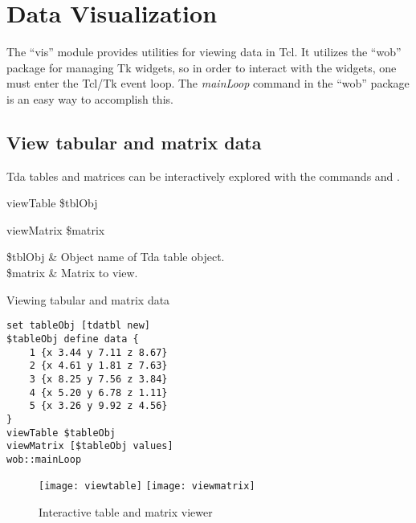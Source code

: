 \cleartooddpage[\thispagestyle{empty}]
\chapter{Data Visualization}\label{vis}
The ``vis'' module provides utilities for viewing data in Tcl. It utilizes the ``wob'' package for managing Tk widgets, so in order to interact with the widgets, one must enter the Tcl/Tk event loop. The \textit{mainLoop} command in the ``wob'' package is an easy way to accomplish this.

\clearpage
\section{View tabular and matrix data}
Tda tables and matrices can be interactively explored with the commands  and .

\begin{syntax}
viewTable \$tblObj
\end{syntax}
\begin{syntax}
viewMatrix \$matrix
\end{syntax}
\begin{args}
\$tblObj & Object name of Tda table object. \\
\$matrix  & Matrix to view. 
\end{args}
\begin{example}{Viewing tabular and matrix data}
\begin{lstlisting}
set tableObj [tdatbl new]
$tableObj define data {
    1 {x 3.44 y 7.11 z 8.67}
    2 {x 4.61 y 1.81 z 7.63}
    3 {x 8.25 y 7.56 z 3.84}
    4 {x 5.20 y 6.78 z 1.11}
    5 {x 3.26 y 9.92 z 4.56}
}
viewTable $tableObj
viewMatrix [$tableObj values]
wob::mainLoop
\end{lstlisting}
\end{example}
\begin{figure}[!htb]
\centering
\texttt{[image: viewtable]}
\texttt{[image: viewmatrix]}
\caption{Interactive table and matrix viewer}
\label{fig:viewdata}
\end{figure}

\clearpage
